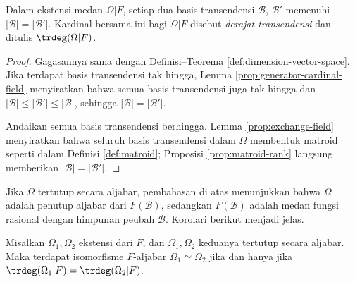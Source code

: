 \begin{definition-theorem}
	Dalam ekstensi medan $\Omega|F$, setiap dua basis transendensi $\mathcal{B}$, $\mathcal{B}'$ memenuhi $|\mathcal{B}| = |\mathcal{B}'|$. Kardinal bersama ini bagi $\Omega|F$ disebut \emph{derajat transendensi} dan ditulis $\trdeg(\Omega|F)$.
\end{definition-theorem}
\begin{proof}
	Gagasannya sama dengan Definisi--Teorema \ref{def:dimension-vector-space}. Jika terdapat basis transendensi tak hingga, Lemma \ref{prop:generator-cardinal-field} menyiratkan bahwa semua basis transendensi juga tak hingga dan $|\mathcal{B}| \leq |\mathcal{B}'| \leq |\mathcal{B}|$, sehingga $|\mathcal{B}|=|\mathcal{B}'|$.
		
	Andaikan semua basis transendensi berhingga. Lemma \ref{prop:exchange-field} menyiratkan bahwa seluruh basis transendensi dalam $\Omega$ membentuk matroid seperti dalam Definisi \ref{def:matroid}; Proposisi \ref{prop:matroid-rank} langsung memberikan $|\mathcal{B}|=|\mathcal{B}'|$.
\end{proof}

Jika $\Omega$ tertutup secara aljabar, pembahasan di atas menunjukkan bahwa $\Omega$ adalah penutup aljabar dari $F(\mathcal{B})$, sedangkan $F(\mathcal{B})$ adalah medan fungsi rasional dengan himpunan peubah $\mathcal{B}$. Korolari berikut menjadi jelas.
\begin{corollary}
	Misalkan $\Omega_1, \Omega_2$ ekstensi dari $F$, dan $\Omega_1, \Omega_2$ keduanya tertutup secara aljabar. Maka terdapat isomorfisme $F$-aljabar $\Omega_1 \simeq \Omega_2$ jika dan hanya jika $\trdeg(\Omega_1|F) = \trdeg(\Omega_2|F)$.
\end{corollary}

